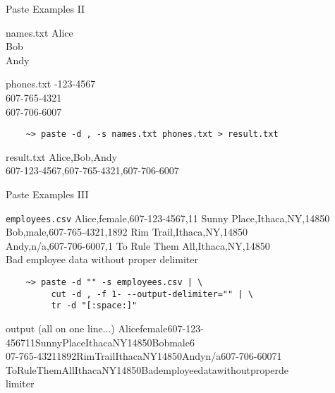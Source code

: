 \begin{frame}[fragile]{Paste Examples II}
  \begin{block}{names.txt}
    {\footnotesize\ttfamily
      Alice\\
      Bob\\
      Andy\\
    }
  \end{block}
  \begin{block}{phones.txt}
    {\footnotesize{}-123-4567\\
      607-765-4321\\
      607-706-6007\\
    }
  \end{block}
  \begin{verbatim}
    ~> paste -d , -s names.txt phones.txt > result.txt
  \end{verbatim}
  \begin{block}{result.txt}
    {\footnotesize\ttfamily
      Alice,Bob,Andy\\
      607-123-4567,607-765-4321,607-706-6007\\
    }
  \end{block}
\end{frame}

\begin{frame}[fragile]{Paste Examples III}
  \begin{block}{\texttt{employees.csv}}
    {\footnotesize\ttfamily
    Alice,female,607-123-4567,11 Sunny Place,Ithaca,NY,14850\\
    Bob,male,607-765-4321,1892 Rim Trail,Ithaca,NY,14850\\
    Andy,n/a,607-706-6007,1 To Rule Them All,Ithaca,NY,14850\\
    Bad employee data without proper delimiter
    }
  \end{block}
  \begin{verbatim}
    ~> paste -d "" -s employees.csv | \
         cut -d , -f 1- --output-delimiter="" | \
         tr -d "[:space:]"
  \end{verbatim}
  \begin{block}{output (all on one line...)}
    {\footnotesize\ttfamily
      Alicefemale607-123-456711SunnyPlaceIthacaNY14850Bobmale6\\
      07-765-43211892RimTrailIthacaNY14850Andyn/a607-706-60071\\
      ToRuleThemAllIthacaNY14850Bademployeedatawithoutproperde\\
      limiter
    }
  \end{block}
\end{frame}

